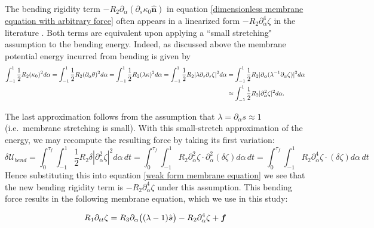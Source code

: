 \documentclass{article}[12pt]
\theoremstyle{Theorem}
\begin{document}
The bending rigidity term  $- R_2\partial_\alpha( \partial_s\kappa_0\hat{\boldsymbol{n}})$ in equation \eqref{dimensionless membrane equation with arbitrary force} often appears in a linearized form $-R_2\partial_\alpha^4\zeta$ in the literature \cite{zhu2002simulation, zhang2026flapping, connell2007flapping}. 
Both terms are equivalent upon applying a ``small stretching" assumption to the bending energy. Indeed, as discussed above the membrane potential energy incurred from bending is given by 
 \begin{align}
     \int_{-1}^1\frac{1}{2}R_2(\kappa_0)^2d\alpha = \int_{-1}^1\frac{1}{2}R_2(\partial_\alpha\theta)^2d\alpha 
     = \int_{-1}^1\frac{1}{2}R_2(\lambda\kappa)^2d\alpha 
     = \int_{-1}^1\frac{1}{2}R_2|\lambda\partial_s\partial_s\zeta|^2d\alpha &= \int_{-1}^1\frac{1}{2}R_2|\partial_\alpha(\lambda^{-1}\partial_\alpha\zeta)|^2d\alpha \notag \\
     &\approx\int_{-1}^1\frac{1}{2}R_2|\partial_\alpha^2\zeta|^2d\alpha. 
 \end{align}
 
The last approximation follows from the assumption that $\lambda =\partial_\alpha s \approx 1$ (i.e.~membrane stretching is small).  With this small-stretch approximation of the energy,
we may recompute the resulting force by taking its first variation:
\begin{equation}
    \delta\mathcal{U}_{bend} =\int_0^{\tau_f}\int_{-1}^1\frac{1}{2}R_2\delta|\partial_\alpha^2\zeta|^2d\alpha\,dt =\int_0^{\tau_f}\int_{-1}^1R_2\partial_\alpha^2\zeta\cdot \partial_{\alpha}^2(\delta\zeta)d\alpha\,dt 
    =\int_0^{\tau_f}\int_{-1}^1R_2\partial_\alpha^4\zeta\cdot (\delta\zeta)d\alpha\,dt 
\end{equation}
Hence substituting this into equation \eqref{weak form membrane equation} we see that the new bending rigidity term is $-R_2\partial_\alpha^4\zeta$ under this assumption.  This bending force results in the following membrane equation, which we use in this study:

\begin{equation}
     R_1\partial_{tt}\zeta  = R_3\partial_\alpha\big( (\lambda-1)\hat{\boldsymbol{s}}\big)- R_2\partial_{\alpha}^4\zeta \\ +\boldsymbol{f}
     \label{bending linearized membrane equation with arbitrary force}
\end{equation}
\end{document}
